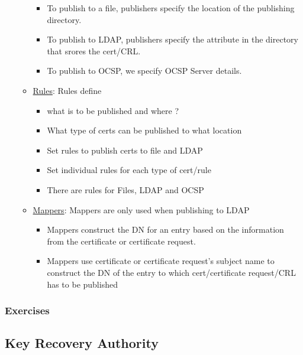 \documentclass[a4paper]{article}
\begin{document}
\begin{itemize}
\begin{itemize}
\begin{itemize}
                            \item To publish to a file, publishers specify the location of the publishing directory.
                            \item To publish to LDAP, publishers specify the attribute in the directory that srores the cert/CRL.
                            \item To publish to OCSP, we specify OCSP Server details. 
                        \end{itemize}
                    \item \underline{Rules}: Rules define 
                        \begin{itemize}
                            \item what is to be published and where ?
                            \item What type of certs can be published to what location
                            \item Set rules to publish certs to file and LDAP
                            \item Set individual rules for each type of cert/rule
                            \item There are rules for Files, LDAP and OCSP
                        \end{itemize}
                    \item \underline{Mappers}: Mappers are only used when publishing to LDAP
                        \begin{itemize}
                            \item Mappers construct the DN for an entry based on the information
                                from the certificate or certificate request. 
                            \item Mappers use certificate or certificate request's subject name to
                                construct the DN of the entry to which cert/certificate request/CRL has to be published
                        \end{itemize}
            \end{itemize}
    \end{itemize}
\subsubsection{Exercises}
\subsection{Key Recovery Authority}
\end{document}
